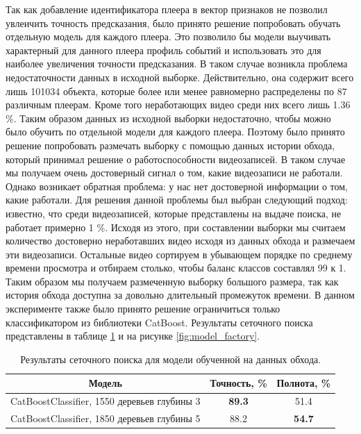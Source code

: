 Так как добавление идентификатора плеера в вектор признаков не позволил увлеичить точность предсказания, было принято решение попробовать обучать отдельную модель для каждого плеера. Это позволило бы модели выучивать характерный для данного плеера профиль событий и использовать это для наиболее увеличения точности предсказания. В таком случае возникла проблема недостаточности данных в исходной выборке. Действительно, она содержит всего лишь 101034 объекта, которые более или менее равномерно распределены по 87 различным плеерам. Кроме того неработающих видео среди них всего лишь 1.36 \%. Таким образом данных из исходной выборки недостаточно, чтобы можно было обучить по отдельной модели для каждого плеера. Поэтому было принято решение попробовать размечать выборку с помощью данных истории обхода, который принимал решение о работоспособности видеозаписей. В таком случае мы получаем очень достоверный сигнал о том, какие видеозаписи не работали. Однако возникает обратная проблема: у нас нет достоверной информации о том, какие работали. Для решения данной проблемы был выбран следующий подход: известно, что среди видеозаписей, которые представлены на выдаче поиска, не работает примерно 1 \%. Исходя из этого, при составлении выборки мы считаем количество достоверно неработавших видео исходя из данных обхода и размечаем эти видеозаписи. Остальные видео сортируем в убывающем порядке по среднему времени просмотра и отбираем столько, чтобы баланс классов составлял 99 к 1. Таким образом мы получаем размеченную выборку большого размера, так как история обхода доступна за довольно длительный промежуток времени. В данном эксперименте также было принято решение ограничиться только классификатором из библиотеки CatBoost. Результаты сеточного поиска представлены в таблице \ref{tab:model_factory} и на рисунке \ref{fig:model_factory}.

\begin{table}[h]
    \centering
    \begin{tabular}{|c|c|c|}
        \hline
        Модель & Точность, \% & Полнота, \% \\
        \hline
        CatBoostClassifier, 1550 деревьев глубины 3 & \textbf{89.3} & 51.4 \\
        \hline
        CatBoostClassifier, 1850 деревьев глубины 5 & 88.2 & \textbf{54.7} \\
        \hline
    \end{tabular}
    \caption{Результаты сеточного поиска для модели обученной на данных обхода.}
    \label{tab:model_factory}
\end{table}

